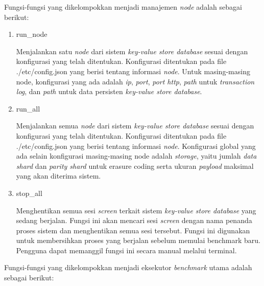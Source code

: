 Fungsi-fungsi yang dikelompokkan menjadi manajemen \textit{node} adalah sebagai berikut:

\begin{enumerate}
  \item run\_node

  Menjalankan satu \textit{node} dari sistem \textit{key-value store database} sesuai dengan konfigurasi yang telah ditentukan. Konfigurasi ditentukan pada file ./etc/config.json yang berisi tentang informasi \textit{node}. Untuk masing-masing node, konfigurasi yang ada adalah \textit{ip}, \textit{port}, \textit{port http}, \textit{path} untuk \textit{transaction log}, dan \textit{path} untuk data persisten \textit{key-value store database}.

  \item run\_all
  
  Menjalankan semua \textit{node} dari sistem \textit{key-value store database} sesuai dengan konfigurasi yang telah ditentukan. Konfigurasi ditentukan pada file ./etc/config.json yang berisi tentang informasi \textit{node}. Konfigurasi global yang ada selain konfigurasi masing-masing node adalah \textit{storage}, yaitu jumlah \textit{data shard} dan \textit{parity shard} untuk erasure coding serta ukuran \textit{payload} maksimal yang akan diterima sistem.
  
  \item stop\_all
  
  Menghentikan semua sesi \textit{screen} terkait sistem \textit{key-value store database} yang sedang berjalan. Fungsi ini akan mencari sesi \textit{screen} dengan nama penanda proses sistem dan menghentikan semua sesi tersebut. Fungsi ini digunakan untuk membersihkan proses yang berjalan sebelum memulai benchmark baru. Pengguna dapat memanggil fungsi ini secara manual melalui terminal.
\end{enumerate}


Fungsi-fungsi yang dikelompokkan menjadi eksekutor \textit{benchmark} utama adalah sebagai berikut:


